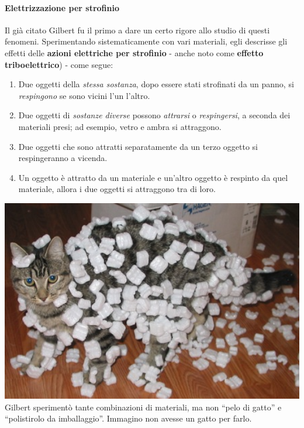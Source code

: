 \paragraph{Elettrizzazione per strofinio}
Il già citato Gilbert fu il primo a dare un certo rigore allo studio di questi fenomeni. Sperimentando sistematicamente con vari materiali, egli descrisse gli effetti delle \textbf{azioni elettriche per strofinio} - anche noto come \textbf{effetto triboelettrico}) - come segue:\\
\begin{minipage}{0.65\textwidth}
\begin{enumerate}[label=\alph*)]
	\item Due oggetti della \textit{stessa sostanza}, dopo essere stati strofinati da un panno, si \textit{respingono} se sono vicini l'un l'altro.
	\item Due oggetti di \textit{sostanze diverse} possono \textit{attrarsi} o \textit{respingersi}, a seconda dei materiali presi; ad esempio, vetro e ambra si attraggono.
	\item Due oggetti che sono attratti separatamente da un terzo oggetto si respingeranno a vicenda.
	\item Un oggetto è attratto da un materiale e un'altro oggetto è respinto da quel materiale, allora i due oggetti si attraggono tra di loro.
\end{enumerate}
\end{minipage}\hspace{10pt}
\begin{minipage}{0.34\textwidth}
		\includegraphics[width=1\textwidth]{images/foamcat.jpg}
	{\scriptsize Gilbert sperimentò tante combinazioni di materiali, ma non ``pelo di gatto'' e ``polistirolo da imballaggio''. Immagino non avesse un gatto per farlo.}
\end{minipage}\vspace{3pt}\\
